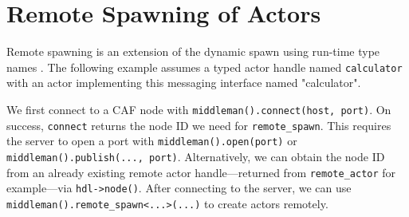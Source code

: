 \section{Remote Spawning of Actors \experimental}
\label{remote-spawn}

Remote spawning is an extension of the dynamic spawn using run-time type names . The following example assumes a typed actor handle named \lstinline^calculator^ with an actor implementing this messaging interface named "calculator".



We first connect to a CAF node with \lstinline^middleman().connect(host, port)^. On success, \lstinline^connect^ returns the node ID we need for \lstinline^remote_spawn^. This requires the server to open a port with \lstinline^middleman().open(port)^ or \lstinline^middleman().publish(..., port)^. Alternatively, we can obtain the node ID from an already existing remote actor handle---returned from \lstinline^remote_actor^ for example---via \lstinline^hdl->node()^. After connecting to the server, we can use \lstinline^middleman().remote_spawn<...>(...)^ to create actors remotely.
